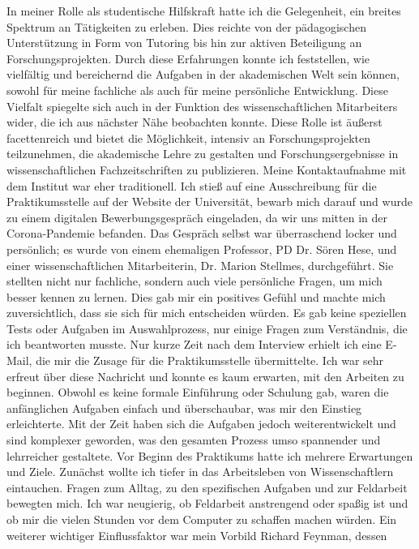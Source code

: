 \documentclass[12pt,a4paper]{report}
\begin{document}
In meiner Rolle als studentische Hilfskraft hatte ich die Gelegenheit, ein
breites Spektrum an Tätigkeiten zu erleben. Dies reichte von der pädagogischen
Unterstützung in Form von Tutoring bis hin zur aktiven Beteiligung an
Forschungsprojekten. Durch diese Erfahrungen konnte ich feststellen, wie
vielfältig und bereichernd die Aufgaben in der akademischen Welt sein können,
sowohl für meine fachliche als auch für meine persönliche Entwicklung.
%
Diese Vielfalt spiegelte sich auch in der Funktion des wissenschaftlichen
Mitarbeiters wider, die ich aus nächster Nähe beobachten konnte. Diese Rolle
ist äußerst facettenreich und bietet die Möglichkeit, intensiv an
Forschungsprojekten teilzunehmen, die akademische Lehre zu gestalten und
Forschungsergebnisse in wissenschaftlichen Fachzeitschriften zu
publizieren.
Meine Kontaktaufnahme mit dem Institut war eher traditionell. Ich stieß auf
eine Ausschreibung für die Praktikumsstelle auf der Website der Universität,
bewarb mich darauf und wurde zu einem digitalen Bewerbungsgespräch eingeladen,
da wir uns mitten in der Corona-Pandemie befanden. Das Gespräch selbst war
überraschend locker und persönlich; es wurde von einem ehemaligen Professor, PD
Dr. Sören Hese, und einer wissenschaftlichen Mitarbeiterin, Dr. Marion
Stellmes, durchgeführt. Sie stellten nicht nur fachliche, sondern auch viele
persönliche Fragen, um mich besser kennen zu lernen. Dies gab mir ein positives
Gefühl und machte mich zuversichtlich, dass sie sich für mich entscheiden
würden.
%
Es gab keine speziellen Tests oder Aufgaben im Auswahlprozess, nur einige
Fragen zum Verständnis, die ich beantworten musste. Nur kurze Zeit nach dem
Interview erhielt ich eine E-Mail, die mir die Zusage für die Praktikumsstelle
übermittelte. Ich war sehr erfreut über diese Nachricht und konnte es kaum
erwarten, mit den Arbeiten zu beginnen.
%
Obwohl es keine formale Einführung oder Schulung gab, waren die anfänglichen
Aufgaben einfach und überschaubar, was mir den Einstieg erleichterte. Mit der
Zeit haben sich die Aufgaben jedoch weiterentwickelt und sind komplexer
geworden, was den gesamten Prozess umso spannender und lehrreicher
gestaltete.
Vor Beginn des Praktikums hatte ich mehrere Erwartungen und Ziele. Zunächst
wollte ich tiefer in das Arbeitsleben von Wissenschaftlern eintauchen. Fragen
zum Alltag, zu den spezifischen Aufgaben und zur Feldarbeit bewegten mich. Ich
war neugierig, ob Feldarbeit anstrengend oder spaßig ist und ob mir die vielen
Stunden vor dem Computer zu schaffen machen würden.
%
Ein weiterer wichtiger Einflussfaktor war mein Vorbild Richard Feynman, dessen
\end{document}
